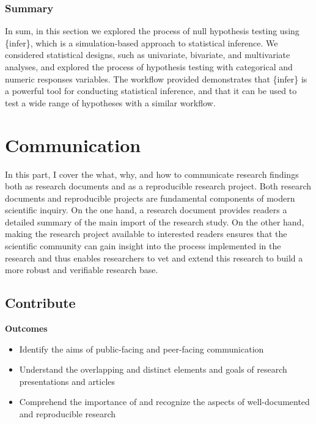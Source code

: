 \documentclass[
  letterpaper,
  krantz1]{latex/krantz-mod}
\providecommand{\tightlist}{%
  \setlength{\itemsep}{0pt}\setlength{\parskip}{0pt}}\usepackage{longtable,booktabs,array}
\newcommand{\setDOI}[1]{\gdef\doi{#1}}
\theoremstyle{definition}
\theoremstyle{definition}
\theoremstyle{remark}
\begin{document}
\section*{Summary}\label{summary-9}


In sum, in this section we explored the process of null hypothesis
testing using \{infer\}, which is a simulation-based approach to
statistical inference. We considered statistical designs, such as
univariate, bivariate, and multivariate analyses, and explored the
process of hypothesis testing with categorical and numeric responses
variables. The workflow provided demonstrates that \{infer\} is a
powerful tool for conducting statistical inference, and that it can be
used to test a wide range of hypotheses with a similar workflow.

\part{Communication}

In this part, I cover the what, why, and how to communicate research
findings both as research documents and as a reproducible research
project. Both research documents and reproducible projects are
fundamental components of modern scientific inquiry. On the one hand, a
research document provides readers a detailed summary of the main import
of the research study. On the other hand, making the research project
available to interested readers ensures that the scientific community
can gain insight into the process implemented in the research and thus
enables researchers to vet and extend this research to build a more
robust and verifiable research base.

\chapter{Contribute}\label{sec-contribute-chapter}

\setDOI{10.4324/9781003393764.11}
\thispagestyle{chapterfirstpage}

\begin{tcolorbox}[enhanced jigsaw, leftrule=.75mm, colframe=quarto-callout-color-frame, left=2mm, colback=white, toprule=.15mm, breakable, arc=.35mm, opacityback=0, bottomrule=.15mm, rightrule=.15mm]

\textbf{ Outcomes}

\begin{itemize}
\tightlist
\item
  Identify the aims of public-facing and peer-facing communication
\item
  Understand the overlapping and distinct elements and goals of research
  presentations and articles
\item
  Comprehend the importance of and recognize the aspects of
  well-documented and reproducible research
\end{itemize}

\end{tcolorbox}
\end{document}
